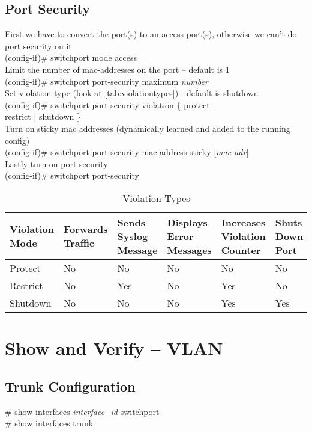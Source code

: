 \subsection{Port Security}
\textrm{First we have to convert the port(s) to an access port(s), otherwise we can’t do port security on it}\\
(config-if)\# switchport mode access\\
\textrm{Limit the number of mac-addresses on the port – default is 1}\\
(config-if)\# switchport port-security maximum \textit{number}\\
\textrm{Set violation type (look at \autoref*{tab:violationtypes}) - default is shutdown}\\
(config-if)\# switchport port-security violation \{ protect | \\restrict | shutdown \}\\
\textrm{Turn on sticky mac addresses (dynamically learned and added to the running config)}\\
(config-if)\# switchport port-security mac-address sticky [\textit{mac-adr}]\\
\textrm{Lastly turn on port security}\\
(config-if)\# switchport port-security

\begin{table}[h]
\tabulinesep=1mm			%
\parindent0pt				%
\begin{tabu}{| X | X | X | X | X | X |}
	\hline
	Violation Mode & Forwards Traffic & Sends Syslog Message & Displays Error Messages & Increases Violation Counter & Shuts Down Port\\ \hline
	Protect & No & No & No & No & No \\ \hline
	Restrict & No & Yes & No & Yes & No \\ \hline
	Shutdown & No & No & No & Yes & Yes \\
	\hline
\end{tabu}
\caption{Violation Types}
\label{tab:violationtypes}
\end{table}

\onehalfspacing
\section{Show and Verify -- VLAN}
\subsection{Trunk Configuration}
\# show interfaces \textit{interface\_id} switchport\\
\# show interfaces trunk

